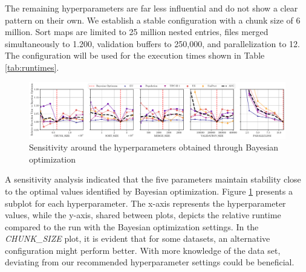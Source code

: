 The remaining hyperparameters are far less influential and do not show a clear pattern on their own. We establish a stable configuration with a chunk size of 6 million. Sort maps are limited to 25 million nested entries, files merged simultaneously to 1.200, validation buffers to 250,000, and parallelization to 12. The configuration will be used for the execution times shown in Table \ref{tab:runtimes}.

\begin{figure}[!t]
    \centering
        \includegraphics[width=.98\textwidth]{figures/sensitivity.pdf}
    \caption{Sensitivity around the hyperparameters obtained through Bayesian optimization}
    \label{fig:hyperparameters}
\end{figure}

A sensitivity analysis indicated that the five parameters maintain stability close to the optimal values identified by Bayesian optimization. Figure \ref{fig:hyperparameters} presents a subplot for each hyperparameter. The x-axis represents the hyperparameter values, while the y-axis, shared between plots, depicts the relative runtime compared to the run with the Bayesian optimization settings. In the \textit{CHUNK\_SIZE} plot, it is evident that for some datasets, an alternative configuration might perform better. With more knowledge of the data set, deviating from our recommended hyperparameter settings could be beneficial.


